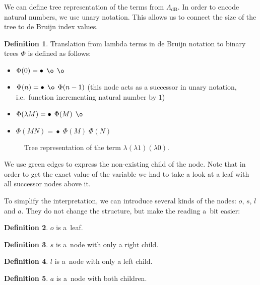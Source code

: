 \documentclass[final]{article}
\theoremstyle{definition}
\newtheorem{definition}{Definition}[subsection]
\theoremstyle{definition}
\theoremstyle{remark}
\newcommand{\LambdadB}{\ensuremath{\Lambda_{\text{dB}}}}
\DeclareMathOperator{\n}{\bullet}
\DeclareMathOperator{\no}{\o}
\begin{document}
We can define tree representation of the terms from \(\LambdadB\). In order to encode natural numbers, we use unary notation. This allows us to connect the size of the tree to de Bruijn index values.

\begin{definition}
    Translation from lambda terms in de Bruijn notation to binary trees \(\Phi\) is defined as follows:
    \begin{itemize}
        \item \(\Phi(0) = \n\; \no\; \no\)
        \item \(\Phi(n) = \n\; \no\; \Phi(n - 1)\) (this node acts as a successor in unary notation, i.e.~function incrementing natural number by \(1\))
        \item \(\Phi(\lambda M) = \n\; \Phi(M)\; \no\)
        \item \(\Phi(M N) = \n\; \Phi(M)\; \Phi(N)\)
    \end{itemize}
\end{definition}

\begin{figure}[H]
    \centering
    
    \caption{Tree representation of the term \(\lambda (\lambda 1) (\lambda 0)\).}%
    \label{fig:lambda_tree_example_2}
\end{figure}

We use green edges to express the non-existing child of the node. Note that in order to get the exact value of the variable we had to take a look at a leaf with all successor nodes above it.

To simplify the interpretation, we can introduce several kinds of the nodes: \(o\), \(s\), \(l\) and \(a\). They do not change the structure, but make the reading a~bit easier:

\begin{definition}
    \(o\) is a~leaf.
\end{definition}

\begin{definition}
    \(s\) is a~node with only a right child.
\end{definition}

\begin{definition}
    \(l\) is a~node with only a left child.
\end{definition}

\begin{definition}
    \(a\) is a~node with both children.
\end{definition}
\end{document}

